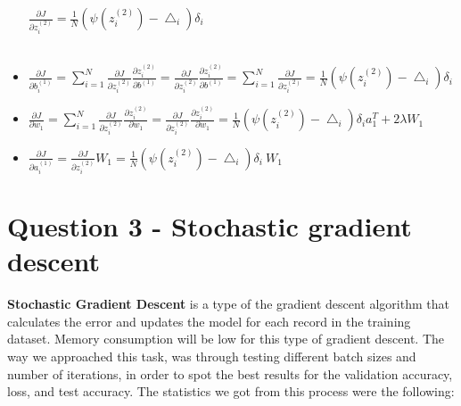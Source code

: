 \documentclass[
	12pt, %
]{fphw}
\begin{document}
\begin{itemize}
$\frac {\partial J}{\partial z_{i}^{(2)}} = \frac{1}{N} (\psi(z_{i}^{(2)}) - \bigtriangleup_i) \delta_i$ \\ \\

\item $\frac{\partial{J}}{\partial {b_{i}^{(1)}}} = \sum_{i=1}^N \frac{\partial{J}}{\partial z_{i}^{(2)}}\frac{\partial z_{i}^{(2)}}{\partial {b^{(1)}}}
= \frac{\partial{J}}{\partial z_{i}^{(2)}}\frac{\partial z_{i}^{(2)}}{\partial {b^{(1)}}}
= \sum_{i=1}^N\frac{\partial{J}}{\partial z_{i}^{(2)}} = \frac{1}{N} (\psi(z_{i}^{(2)}) - \bigtriangleup_i) \delta_i$

\item $\frac{\partial{J}}{\partial {w_1}} = \sum_{i=1}^N \frac{\partial{J}}{\partial z_{i}^{(2)}}\frac{\partial z_{i}^{(2)}}{\partial {w_1}}
= \frac{\partial{J}}{\partial z_{i}^{(2)}}\frac{\partial z_{i}^{(2)}}{\partial {w_1}}
= \frac{1}{N} (\psi(z_{i}^{(2)}) - \bigtriangleup_i) \delta_i{a_1^T}+2\lambda W_1$

\item $\frac {\partial J}{\partial a_i^{(1)}} = \frac {\partial J}{\partial z_{i}^{(2)}} W_1 = \frac{1}{N} (\psi(z_{i}^{(2)}) - \bigtriangleup_i) \delta_i \ W_1$

\end{itemize}

\newpage
\section*{Question 3 - Stochastic gradient descent }
\textbf{Stochastic Gradient Descent} is a type of the gradient descent algorithm that calculates the error and updates the model for each record in the training dataset. Memory consumption will be low for this type of gradient descent. The way we approached this task, was through testing different batch sizes and number of iterations, in order to spot the best results for the validation accuracy, loss, and test accuracy. The statistics we got from this process were the following:
\end{document}
